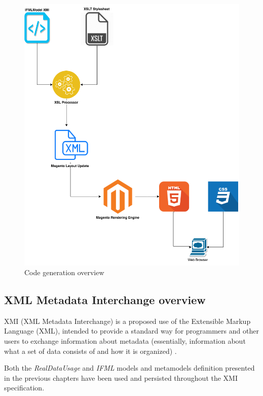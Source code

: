 \vspace{0.5cm}
\begin{figure}[H]
  \centering
    \includegraphics[width=14cm]{images/code-generation.png}
  \caption{Code generation overview}
  \label{fig:code-generation}
\end{figure}
\vspace{0.5cm}

\subsection{XML Metadata Interchange overview}

XMI (XML Metadata Interchange) is a proposed use of the Extensible Markup Language (XML), intended to provide a standard way for programmers and other users to exchange information about metadata (essentially, information about what a set of data consists of and how it is organized) \cite{xmi}. 

Both the \textit{RealDataUsage} and \textit{IFML} models and metamodels definition presented in the previous chapters have been used and persisted throughout the XMI specification.

